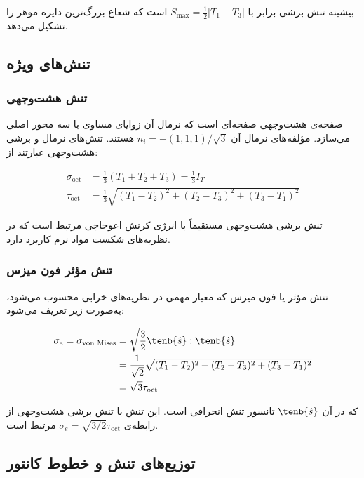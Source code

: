 بیشینه تنش برشی برابر با $S_{\max} = \frac{1}{2}|T_1 - T_3|$ است که شعاع بزرگ‌ترین دایره موهر را تشکیل می‌دهد.

\subsection{تنش‌های ویژه}

\subsubsection{تنش هشت‌وجهی}

صفحه‌ی هشت‌وجهی صفحه‌ای است که نرمال آن زوایای مساوی با سه محور اصلی می‌سازد. مؤلفه‌های نرمال آن $n_i = \pm(1,1,1)/\sqrt{3}$ هستند. تنش‌های نرمال و برشی هشت‌وجهی عبارتند از:

\begin{align}
	\sigma_{\text{oct}} & = \frac{1}{3}(T_1 + T_2 + T_3) = \frac{1}{3} I_T                  \\
	\tau_{\text{oct}}   & = \frac{1}{3}\sqrt{(T_1 - T_2)^2 + (T_2 - T_3)^2 + (T_3 - T_1)^2}
\end{align}

تنش برشی هشت‌وجهی مستقیماً با انرژی کرنش اعوجاجی مرتبط است که در نظریه‌های شکست مواد نرم کاربرد دارد.

\subsubsection{تنش مؤثر فون میزس}

تنش مؤثر یا فون میزس که معیار مهمی در نظریه‌های خرابی محسوب می‌شود، به‌صورت زیر تعریف می‌شود:

\begin{align}
	\sigma_e = \sigma_{\text{von Mises}} & = \sqrt{\frac{3}{2} \tenb{\hat{s}} : \tenb{\hat{s}}}                     \\
	                                     & = \frac{1}{\sqrt{2}}\sqrt{(T_1 - T_2)^2 + (T_2 - T_3)^2 + (T_3 - T_1)^2} \\
	                                     & = \sqrt{3} \tau_{\text{oct}}
\end{align}

که در آن $\tenb{\hat{s}}$ تانسور تنش انحرافی است. این تنش با تنش برشی هشت‌وجهی از رابطه‌ی $\sigma_e = \sqrt{3/2} \tau_{\text{oct}}$ مرتبط است.

\subsection{توزیع‌های تنش و خطوط کانتور}

